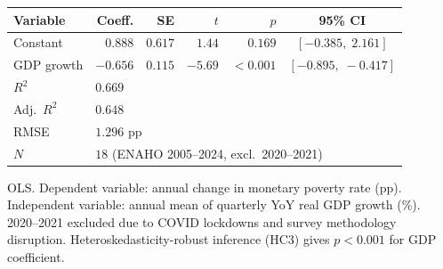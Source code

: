 
\begin{tabular}{lrrrrc}
\toprule
Variable & Coeff. & SE & $t$ & $p$ & 95\% CI \\
\midrule
    Constant & $0.888$ & $0.617$ & $1.44$ & $0.169$ & $[-0.385,\;2.161]$ \\
    GDP growth & $-0.656$ & $0.115$ & $-5.69$ & $<0.001$ & $[-0.895,\;-0.417]$ \\
\midrule
    $R^2$ & \multicolumn{5}{l}{$0.669$} \\
    Adj.\ $R^2$ & \multicolumn{5}{l}{$0.648$} \\
    RMSE & \multicolumn{5}{l}{$1.296$ pp} \\
    $N$ & \multicolumn{5}{l}{$18$ (ENAHO 2005--2024, excl.\ 2020--2021)} \\
\bottomrule
\end{tabular}
\begin{tablenotes}
\small OLS. Dependent variable: annual change in monetary poverty rate (pp).
Independent variable: annual mean of quarterly YoY real GDP growth (\%).
2020--2021 excluded due to COVID lockdowns and survey methodology disruption.
Heteroskedasticity-robust inference (HC3) gives $p<0.001$ for GDP coefficient.
\end{tablenotes}
